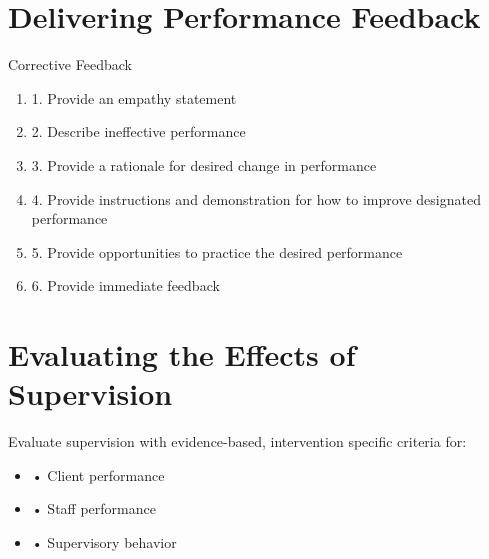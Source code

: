 \section{Delivering Performance Feedback}
Corrective Feedback
\begin{enumerate} 
\item        1. Provide an empathy statement 
\item        2. Describe ineffective performance 
\item        3. Provide a rationale for desired change in performance 
\item        4. Provide instructions and demonstration for how to improve designated performance 
\item        5. Provide opportunities to practice the desired performance 
\item        6. Provide immediate feedback 
\end{enumerate}

\section{Evaluating the Effects of Supervision}
Evaluate supervision with evidence-based, intervention specific criteria for:
\begin{itemize}
\item    • Client performance
\item    • Staff performance
\item    • Supervisory behavior 
\end{itemize}
%

